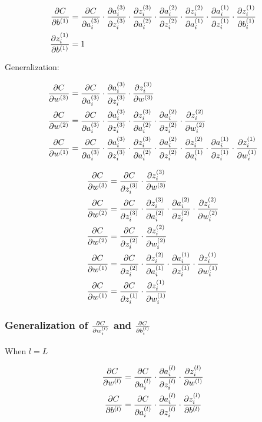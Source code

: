 \documentclass{article}
\begin{document}
\begin{align}
  \pd{C}{b^{(1)}} &= \pd{C}{a_i^{(3)}}
  \cdot \pd{a_i^{(3)}}{z_i^{(3)}}
  \cdot \pd{z_i^{(3)}}{a_i^{(2)}}
  \cdot \pd{a_i^{(2)}}{z_i^{(2)}}
  \cdot \pd{z_i^{(2)}}{a_i^{(1)}}
  \cdot \pd{a_i^{(1)}}{z_i^{(1)}}
  \cdot \pd{z_i^{(1)}}{b_i^{(1)}} \\
\pd{z_i^{(1)}}{b^{(1)}} &= 1
\end{align}

Generalization:

\begin{align}
\pd{C}{w^{(3)}} &= \pd{C}{a_i^{(3)}}
  \cdot \pd{a_i^{(3)}}{z_i^{(3)}}
  \cdot \pd{z_i^{(3)}}{w^{(3)}} \\
\pd{C}{w^{(2)}} &= \pd{C}{a_i^{(3)}}
  \cdot \pd{a_i^{(3)}}{z_i^{(3)}}
  \cdot \pd{z_i^{(3)}}{a_i^{(2)}}
  \cdot \pd{a_i^{(2)}}{z_i^{(2)}}
  \cdot \pd{z_i^{(2)}}{w_i^{(2)}}\\
\pd{C}{w^{(1)}} &= \pd{C}{a_i^{(3)}}
  \cdot \pd{a_i^{(3)}}{z_i^{(3)}}
  \cdot \pd{z_i^{(3)}}{a_i^{(2)}}
  \cdot \pd{a_i^{(2)}}{z_i^{(2)}}
  \cdot \pd{z_i^{(2)}}{a_i^{(1)}}
  \cdot \pd{a_i^{(1)}}{z_i^{(1)}}
  \cdot \pd{z_i^{(1)}}{w_i^{(1)}}
\end{align}

\begin{align}
\pd{C}{w^{(3)}} &= \pd{C}{z_i^{(3)}}
  \cdot \pd{z_i^{(3)}}{w^{(3)}} \\
\pd{C}{w^{(2)}} &= \pd{C}{z_i^{(3)}}
  \cdot \pd{z_i^{(3)}}{a_i^{(2)}}
  \cdot \pd{a_i^{(2)}}{z_i^{(2)}}
  \cdot \pd{z_i^{(2)}}{w_i^{(2)}}\\
\pd{C}{w^{(2)}} &= \pd{C}{z_i^{(2)}}
  \cdot \pd{z_i^{(2)}}{w_i^{(2)}}\\
\pd{C}{w^{(1)}} &= \pd{C}{z_i^{(2)}}
  \cdot \pd{z_i^{(2)}}{a_i^{(1)}}
  \cdot \pd{a_i^{(1)}}{z_i^{(1)}}
  \cdot \pd{z_i^{(1)}}{w_i^{(1)}}\\
\pd{C}{w^{(1)}} &= \pd{C}{z_i^{(1)}}
  \cdot \pd{z_i^{(1)}}{w_i^{(1)}}
\end{align}

\subsubsection{Generalization of $\pd{C}{w_i^{(l)}}$ and $\pd{C}{b_i^{(l)}}$}

When $l = L$

\begin{align}
\pd{C}{w^{(l)}} &= \pd{C}{a_i^{(l)}}
  \cdot \pd{a_i^{(l)}}{z_i^{(l)}}
  \cdot \pd{z_i^{(l)}}{w^{(l)}} \\
\pd{C}{b^{(l)}} &= \pd{C}{a_i^{(l)}}
  \cdot \pd{a_i^{(l)}}{z_i^{(l)}}
  \cdot \pd{z_i^{(l)}}{b^{(l)}}
\end{align}
\end{document}
